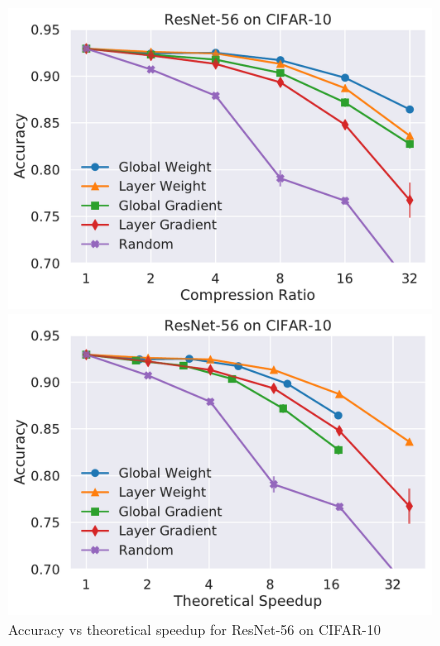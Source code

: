 \begin{figure}
\begin{minipage}[b]{.45\textwidth}
\centering
\includegraphics[width=\linewidth]{shrinkbench/resnet56_CIFAR10_comp}
\end{minipage}
\hfill
\begin{minipage}[b]{.45\textwidth}
\centering
\includegraphics[width=\linewidth]{shrinkbench/resnet56_CIFAR10_flops}
\caption{Accuracy vs theoretical speedup for ResNet-56 on CIFAR-10}
\end{minipage}
\end{figure}





